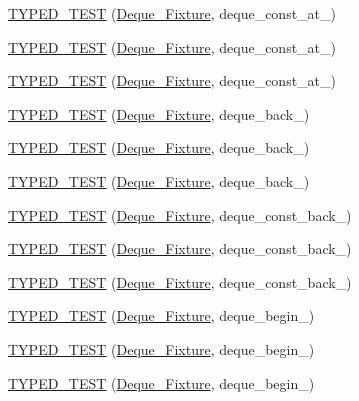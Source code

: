 \begin{DoxyCompactItemize}
\item 
\hyperlink{TestDeque_8c_09_09_a9b8424951d8673748872d40581a45ca0}{T\-Y\-P\-E\-D\-\_\-\-T\-E\-S\-T} (\hyperlink{structDeque__Fixture}{Deque\-\_\-\-Fixture}, deque\-\_\-const\-\_\-at\-\_)
\item 
\hyperlink{TestDeque_8c_09_09_aa0c809dbff08e04b6efb2ab69ce39e09}{T\-Y\-P\-E\-D\-\_\-\-T\-E\-S\-T} (\hyperlink{structDeque__Fixture}{Deque\-\_\-\-Fixture}, deque\-\_\-const\-\_\-at\-\_)
\item 
\hyperlink{TestDeque_8c_09_09_ad7b9b87336d4d4ded615adb58d2d43db}{T\-Y\-P\-E\-D\-\_\-\-T\-E\-S\-T} (\hyperlink{structDeque__Fixture}{Deque\-\_\-\-Fixture}, deque\-\_\-const\-\_\-at\-\_)
\item 
\hyperlink{TestDeque_8c_09_09_a8d2b8dfe57752e8fb9ce4cb88a3786ae}{T\-Y\-P\-E\-D\-\_\-\-T\-E\-S\-T} (\hyperlink{structDeque__Fixture}{Deque\-\_\-\-Fixture}, deque\-\_\-back\-\_)
\item 
\hyperlink{TestDeque_8c_09_09_a5acb621ccde11a8aabf537549730b99f}{T\-Y\-P\-E\-D\-\_\-\-T\-E\-S\-T} (\hyperlink{structDeque__Fixture}{Deque\-\_\-\-Fixture}, deque\-\_\-back\-\_)
\item 
\hyperlink{TestDeque_8c_09_09_a518420569da0d84a3ea3ab345933f4d1}{T\-Y\-P\-E\-D\-\_\-\-T\-E\-S\-T} (\hyperlink{structDeque__Fixture}{Deque\-\_\-\-Fixture}, deque\-\_\-back\-\_)
\item 
\hyperlink{TestDeque_8c_09_09_a0f19411b2c86dce458c007d62c71e9e4}{T\-Y\-P\-E\-D\-\_\-\-T\-E\-S\-T} (\hyperlink{structDeque__Fixture}{Deque\-\_\-\-Fixture}, deque\-\_\-const\-\_\-back\-\_)
\item 
\hyperlink{TestDeque_8c_09_09_ac9ae59c3843367e3ea67508cec3dcfe1}{T\-Y\-P\-E\-D\-\_\-\-T\-E\-S\-T} (\hyperlink{structDeque__Fixture}{Deque\-\_\-\-Fixture}, deque\-\_\-const\-\_\-back\-\_)
\item 
\hyperlink{TestDeque_8c_09_09_ae049b265227da40ab7cd64acb8600744}{T\-Y\-P\-E\-D\-\_\-\-T\-E\-S\-T} (\hyperlink{structDeque__Fixture}{Deque\-\_\-\-Fixture}, deque\-\_\-const\-\_\-back\-\_)
\item 
\hyperlink{TestDeque_8c_09_09_acb9274de83e8aeb4cc18f5a56e6ad58a}{T\-Y\-P\-E\-D\-\_\-\-T\-E\-S\-T} (\hyperlink{structDeque__Fixture}{Deque\-\_\-\-Fixture}, deque\-\_\-begin\-\_)
\item 
\hyperlink{TestDeque_8c_09_09_a3f36e3ea4a278e3df0b409757f80a19d}{T\-Y\-P\-E\-D\-\_\-\-T\-E\-S\-T} (\hyperlink{structDeque__Fixture}{Deque\-\_\-\-Fixture}, deque\-\_\-begin\-\_)
\item 
\hyperlink{TestDeque_8c_09_09_a2b7d6b93665bc0c8cbf33b4999ece851}{T\-Y\-P\-E\-D\-\_\-\-T\-E\-S\-T} (\hyperlink{structDeque__Fixture}{Deque\-\_\-\-Fixture}, deque\-\_\-begin\-\_)

\end{DoxyCompactItemize}
